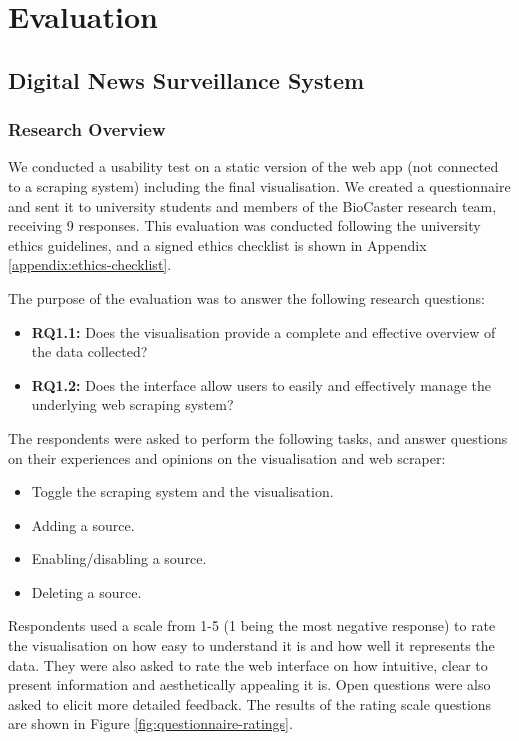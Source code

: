 \documentclass{l4proj}
\begin{document}
\chapter{Evaluation}

\section{Digital News Surveillance System}
\subsection{Research Overview}
We conducted a usability test on a static version of the web app (not connected to a scraping system) including the final visualisation. We created a questionnaire and sent it to university students and members of the BioCaster research team, receiving 9 responses. This evaluation was conducted following the university ethics guidelines, and a signed ethics checklist is shown in Appendix \ref{appendix:ethics-checklist}. \par
The purpose of the evaluation was to answer the following research questions:
\begin{itemize}
    \item \textbf{RQ1.1: } Does the visualisation provide a complete and effective overview of the data collected?
    \item \textbf{RQ1.2: } Does the interface allow users to easily and effectively manage the underlying web scraping system?
\end{itemize}

The respondents were asked to perform the following tasks, and answer questions on their experiences and opinions on the visualisation and web scraper:
\begin{itemize}
    \item Toggle the scraping system and the visualisation.
    \item Adding a source.
    \item Enabling/disabling a source.
    \item Deleting a source.
\end{itemize}

Respondents used a scale from 1-5 (1 being the most negative response) to rate the visualisation on how easy to understand it is and how well it represents the data. They were also asked to rate the web interface on how intuitive, clear to present information and aesthetically appealing it is. Open questions were also asked to elicit more detailed feedback. The results of the rating scale questions are shown in Figure \ref{fig:questionnaire-ratings}.
\end{document}
